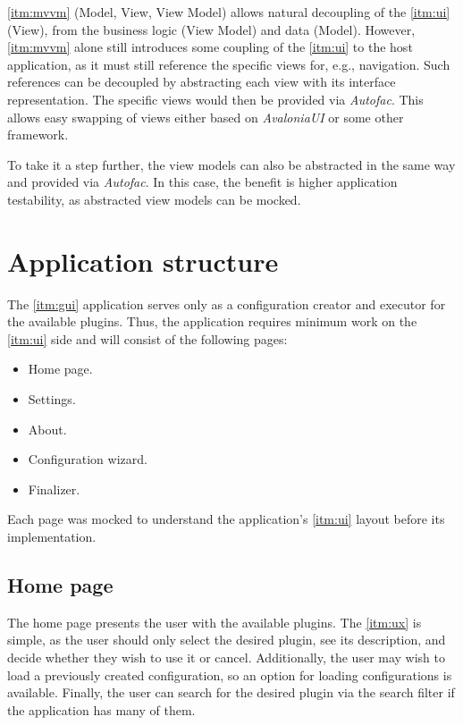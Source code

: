 \ref{itm:mvvm} (Model, View, View Model) allows natural decoupling of the \ref{itm:ui} (View), from the business logic (View Model) and data (Model). However, \ref{itm:mvvm} alone still introduces some coupling of the \ref{itm:ui} to the host application, as it must still reference the specific views for, e.g., navigation. Such references can be decoupled by abstracting each view with its interface representation. The specific views would then be provided via \textit{Autofac}. This allows easy swapping of views either based on \textit{AvaloniaUI} or some other framework.

To take it a step further, the view models can also be abstracted in the same way and provided via \textit{Autofac}. In this case, the benefit is higher application testability, as abstracted view models can be mocked.

\section{Application structure}

The \ref{itm:gui} application serves only as a configuration creator and executor for the available plugins.
Thus, the application requires minimum work on the \ref{itm:ui} side and will consist of the following pages:
\begin{itemize}
    \item Home page.
    \item Settings.
    \item About.
    \item Configuration wizard.
    \item Finalizer.
\end{itemize}

Each page was mocked to understand the application's \ref{itm:ui} layout before its implementation.

\subsection{Home page}

The home page presents the user with the available plugins. The \ref{itm:ux} is simple, as the user should only select the desired plugin, see its description, and decide whether they wish to use it or cancel.
Additionally, the user may wish to load a previously created configuration, so an option for loading configurations is available.
Finally, the user can search for the desired plugin via the search filter if the application has many of them.

